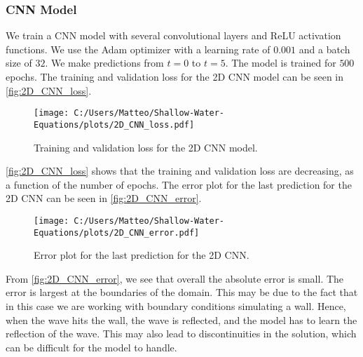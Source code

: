 \subsubsection*{CNN Model}
We train a CNN model with several convolutional layers and ReLU activation functions.
We use the Adam optimizer with a learning rate of $0.001$ and a batch size of $32$.
We make predictions from $t = 0$ to $t = 5$.
The model is trained for $500$ epochs.
The training and validation loss for the 2D CNN model can be seen in \autoref{fig:2D_CNN_loss}.
\begin{figure}[H]
    \centering
    \texttt{[image: C:/Users/Matteo/Shallow-Water-Equations/plots/2D\_CNN\_loss.pdf]}
    \caption{Training and validation loss for the 2D CNN model.}\label{fig:2D_CNN_loss}
\end{figure}
\autoref{fig:2D_CNN_loss} shows that the training and validation loss are decreasing, as a function of the number of epochs.
The error plot for the last prediction for the 2D CNN can be seen in \autoref{fig:2D_CNN_error}.
\begin{figure}[H]
    \centering
    \texttt{[image: C:/Users/Matteo/Shallow-Water-Equations/plots/2D\_CNN\_error.pdf]}
    \caption{Error plot for the last prediction for the 2D CNN.}\label{fig:2D_CNN_error}
\end{figure}
From \autoref{fig:2D_CNN_error}, we see that overall the absolute error is small.
The error is largest at the boundaries of the domain. 
This may be due to the fact that in this case we are working with boundary conditions simulating a wall.
Hence, when the wave hits the wall, the wave is reflected, and the model has to learn the reflection of the wave.
This may also lead to discontinuities in the solution, which can be difficult for the model to handle.

